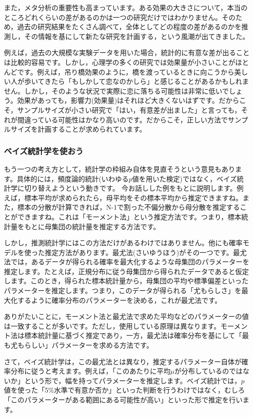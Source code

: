 \documentclass{ltjsbook}
\begin{document}
また，メタ分析の重要性も高まっています。ある効果の大きさについて，本当のところどれくらいの差があるのかは一つの研究だけではわかりません。そのため，過去の研究結果をたくさん調べて，全体としてどの程度の差があるのかを推測し，その情報を基にして新たな研究を計画する，という風潮が出てきました。

例えば，過去の大規模な実験データを用いた場合，統計的に有意な差が出ることは比較的容易です。しかし，心理学の多くの研究では効果量が小さいことがほとんどです。例えば，吊り橋効果のように，橋を渡っているときに向こうから美しい人が歩いてきたら「もしかして恋なのかしら」と感じることがあるかもしれません。しかし，そのような状況で実際に恋に落ちる可能性は非常に低いでしょう。効果があっても，影響力(効果量)はそれほど大きくないはずです。だからこそ，サンプルサイズが小さい研究で「はい，有意差が出ました」と言っても，それが間違っている可能性はかなり高いのです。だからこそ，正しい方法でサンプルサイズを計画することが求められています。

\subsubsection{ベイズ統計学を使おう}
もう一つの考え方として，統計学の枠組み自体を見直そうという意見もあります。具体的には，頻度論的統計(いわゆる$p$値を用いた検定)ではなく，ベイズ統計学に切り替えようという動きです。
今お話しした例をもとに説明します。例えば，標本平均が求められたら，母平均をその標本平均から推定できますね。また，標本の分散が計算できれば，N-1で割った不偏分散から母分散を推定することができますね。これは「モーメント法」という推定方法です。つまり，標本統計量をもとに母集団の統計量を推定する方法です。

しかし，推測統計学にはこの方法だけがあるわけではありません。他にも確率モデルを使った推定方法があります。最尤法(さいゆうほう)がその一つです。最尤法では，あるデータが得られる確率を最大化するような母集団のパラメーターを推定します。たとえば，正規分布に従う母集団から得られたデータであると仮定します。このとき，得られた標本統計量から，母集団の平均や標準偏差といったパラメーターを推定します。つまり，このデータが得られる「尤もらしさ」を最大化するように確率分布のパラメーターを決める，これが最尤法です。

ありがたいことに，モーメント法と最尤法で求めた平均などのパラメーターの値は一致することが多いです。ただし，使用している原理は異なります。モーメント法は標本統計量に基づく推定であり，一方，最尤法は確率分布を基にして「最も尤もらしい」パラメーターを求める方法です。

さて，ベイズ統計学は，この最尤法とは異なり，推定するパラメーター自体が確率分布に従うと考えます。例えば，「このあたりに平均$\mu$が分布しているのではないか」という形で，幅を持ってパラメーターを推定します。ベイズ統計では，$p$値を使った「5\%水準で有意か否か」といった判断を行うわけではなく，むしろ「このパラメーターがある範囲にある可能性が高い」といった形で推定を行います。
\end{document}
